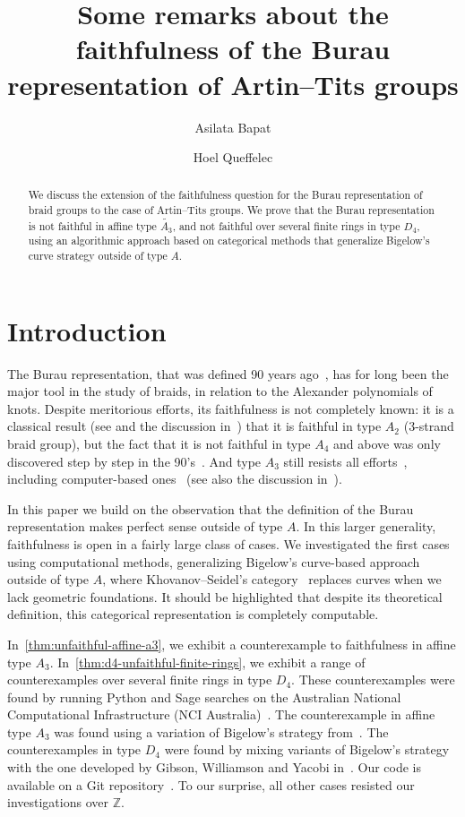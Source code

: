 \documentclass[a4paper]{amsart}
\title[Burau representation of Artin--Tits groups]{Some remarks about the faithfulness of the Burau representation of Artin--Tits groups}
\author{Asilata Bapat}
\author{Hoel Queffelec}
\newcommand{\Z}{\mathbb{Z}}
\newcommand{\0}{\mathbf{0}}
\renewcommand{\tilde}{\widetilde}
\theoremstyle{theorem}
\begin{document}
\maketitle

\begin{abstract}
  We discuss the extension of the faithfulness question for the Burau representation of braid groups to the case of Artin--Tits groups. We prove that the Burau representation is not faithful in affine type $\tilde{A_3}$, and not faithful over several finite rings in type $D_4$, using an algorithmic approach based on categorical methods that generalize Bigelow's curve strategy outside of type $A$.
\end{abstract}


\section{Introduction}

The Burau representation, that was defined 90 years ago~\cite{Burau}, has for long been the major tool in the study of braids, in relation to the Alexander polynomials of knots. Despite meritorious efforts, its faithfulness is not completely known: it is a classical result (see \cite{MagnusPeluso} and the discussion in~\cite{Birman_book}) that it is faithful in type $A_2$ (3-strand braid group), but the fact that it is not faithful in type $A_4$ and above was only discovered step by step in the 90's~\cite{Moody,LongPaton,Bigelow_Burau}. And type $A_3$ still resists all efforts~\cite{CooperLong,BeridzeTraczyk,Datta,GibsonWilliamsonYacobi}, including computer-based ones~\cite{FullartonShadrach} (see also the discussion in~\cite{BharathramBirman}).

In this paper we build on the observation that the definition of the Burau representation makes perfect sense outside of type $A$. In this larger generality, faithfulness is open in a fairly large class of cases. We investigated the first cases using computational methods, generalizing Bigelow's curve-based approach outside of type $A$, where Khovanov--Seidel's category~\cite{KhS} replaces curves when we lack geometric foundations. It should be highlighted that despite its theoretical definition, this categorical representation is completely computable.

In~\cref{thm:unfaithful-affine-a3}, we exhibit a counterexample to faithfulness in affine type \(A_3\).
In~\cref{thm:d4-unfaithful-finite-rings}, we exhibit a range of counterexamples over several finite rings in type \(D_4\).
These counterexamples were found by running Python and Sage searches on the Australian National Computational Infrastructure (NCI Australia)~\cite{nci}.
The counterexample in affine type \(A_3\) was found using a variation of Bigelow's strategy from~\cite{Bigelow_Burau}.
The counterexamples in type \(D_4\) were found by mixing variants of Bigelow's strategy with the one developed by Gibson, Williamson and Yacobi in~\cite{GibsonWilliamsonYacobi}.
Our code is available on a Git repository~\cite{BQ_git}.
To our surprise, all other cases resisted our investigations over $\Z$.
\end{document}
